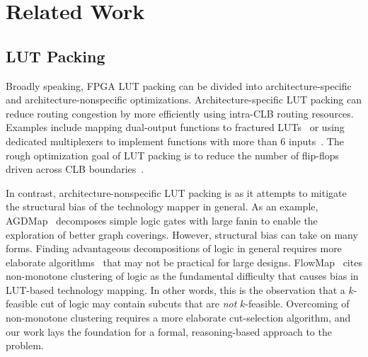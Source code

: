 \section{Related Work}\label{sec:relatedwork}
\subsection{LUT Packing}\label{sec:relatedwork:fpga}
Broadly speaking, FPGA LUT packing can be divided into architecture-specific
and architecture-nonspecific optimizations.  Architecture-specific LUT packing
can reduce routing congestion by more efficiently using intra-CLB routing
resources. Examples include mapping dual-output functions to fractured
LUTs~\cite{fraclut} or using dedicated multiplexers to implement functions with
more than 6 inputs~\cite{ug574}. The rough optimization goal of LUT packing is
to reduce the number of flip-flops driven across CLB boundaries~\cite{ffpack}.

In contrast, architecture-nonspecific LUT packing is  as it
attempts to mitigate the structural bias of the technology mapper in general.
 As an example, AGDMap~\cite{adaptdecomp} decomposes
simple logic gates with large fanin to enable the exploration of better graph
coverings. However, structural bias can take on many forms. Finding
advantageous decompositions of logic in general requires more elaborate
algorithms~\cite{dsd} that may not be practical for large designs. 
FlowMap~\cite{flowmap} cites non-monotone clustering of logic as the
fundamental difficulty that causes bias in LUT-based technology mapping. In
other words, this is the observation that a $k$-feasible cut of logic may
contain subcuts that are \textit{not} $k$-feasible. Overcoming 
 of non-monotone clustering requires a more elaborate
cut-selection algorithm, and our work lays the foundation for a formal,
reasoning-based approach to the problem.

